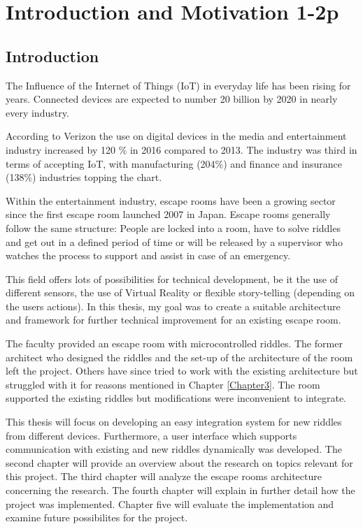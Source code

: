 
\chapter{Introduction and Motivation 1-2p} %

\label{Chapter1} %


\section{Introduction}

The Influence of the Internet of Things (IoT) in everyday life has been rising for years.
Connected devices are expected to number 20 billion \parencite{gartner0} by 2020 in nearly every industry.

According to Verizon \parencite{verizon} the use on digital devices in the media and entertainment industry increased by 120 \% in 2016 compared to 2013.
The industry was third in terms of accepting IoT,
with manufacturing (204\%) and finance and insurance (138\%) industries topping the chart.

Within the entertainment industry, escape rooms have been a growing sector since the first escape room launched 2007 in Japan.
Escape rooms generally follow the same structure: People are locked into a room, have to solve riddles
and get out in a defined period of time or will be released by a supervisor who watches the process to support
and assist in case of an emergency.

This field offers lots of possibilities for technical development, be it the use of different sensors, the use of Virtual Reality or flexible story-telling (depending on the users actions).
In this thesis, my goal was to create a suitable architecture and framework for further technical improvement for an existing escape room.

The faculty provided an escape room with microcontrolled riddles.
The former architect who designed the riddles and the set-up of the architecture of the room left the project.
Others have since tried to work with the existing architecture but struggled with it for reasons mentioned in Chapter \ref{Chapter3}.
The room supported the existing riddles but modifications were inconvenient to integrate.

This thesis will focus on developing an easy integration system for new riddles from different devices.
Furthermore, a user interface which supports communication with existing and new riddles dynamically was developed.
The second chapter will provide an overview about the research on topics relevant for this project. 
The third chapter will analyze the escape rooms architecture concerning the research. 
The fourth chapter will explain in further detail how the project was implemented. 
Chapter five will evaluate the implementation and examine future possibilites for the project.

